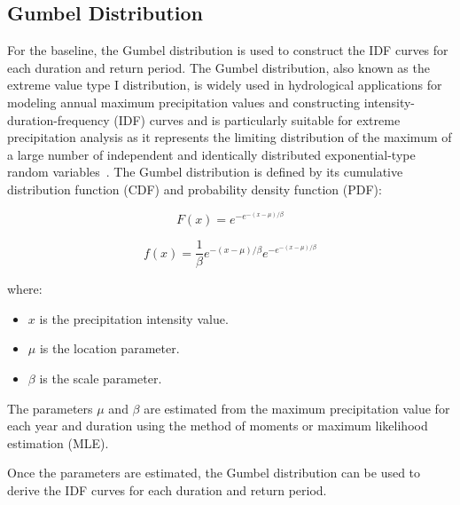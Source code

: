 \subsection{Gumbel Distribution}
For the baseline, the Gumbel distribution is used to construct the IDF curves for each duration and return period.
The Gumbel distribution, also known as the extreme value type I distribution, is widely used in hydrological applications for modeling annual maximum precipitation values and constructing intensity-duration-frequency (IDF) curves and is particularly suitable for extreme precipitation analysis as it represents the limiting distribution of the maximum of a large number of independent and identically distributed exponential-type random variables~\cite{}.
The Gumbel distribution is defined by its cumulative distribution function (CDF) and probability density function (PDF):

\begin{equation}
F(x) = e^{-e^{-(x - \mu)/\beta}}
\end{equation}

\begin{equation}
f(x) = \frac{1}{\beta} e^{-(x - \mu)/\beta} e^{-e^{-(x - \mu)/\beta}}
\end{equation}

where:
\begin{itemize}
  \item $x$ is the precipitation intensity value.
  \item $\mu$ is the location parameter.
  \item $\beta$ is the scale parameter.
\end{itemize}
The parameters $\mu$ and $\beta$ are estimated from the maximum precipitation value for each year and duration using the method of moments or maximum likelihood estimation (MLE).

Once the parameters are estimated, the Gumbel distribution can be used to derive the IDF curves for each duration and return period.